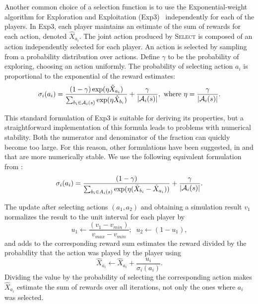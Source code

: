 Another common choice of a selection function is to use the Exponential-weight algorithm for Exploration and Exploitation (Exp3)~\cite{Auer2003Exp3} independently for each of the players.
In Exp3, each player maintains an estimate of the sum of rewards for each action, denoted $\hat{X}_{a_i}$.
The joint action produced by \textsc{Select} is composed of an action independently selected for each player.
An action is selected by sampling from a probability distribution over actions.
Define $\gamma$ to be the probability of exploring, \ie choosing an action uniformly.
The probability of selecting action $a_i$ is proportional to the exponential of the reward estimates:
\begin{equation}\label{eq:exp3select}
\sigma_i(a_i) = \frac{(1-\gamma) \exp(\eta \hat{X}_{a_i})}{\sum_{b_i \in \mathcal{A}_i(s)} \exp(\eta \hat{X}_{b_i})} + \frac{\gamma}{|\mathcal{A}_i(s)|},
  \mbox{ where } \eta = \frac{\gamma}{|\mathcal{A}_i(s)|}.
\end{equation}

This standard formulation of Exp3 is suitable for deriving its properties, but a straightforward implementation of this formula leads to problems with numerical stability. Both the numerator and denominator of the fraction can quickly become too large. For this reason, other formulations have been suggested, \eg in \cite{Lanctot13Goofspiel} and \cite{Cowling12ISMCTS} that are more numerically stable. We use the following equivalent formulation from \cite{Cowling12ISMCTS}:
\begin{equation} \label{eq:exp3:stable}
\sigma_i(a_i) = \frac{(1-\gamma)}{\sum_{b_i \in A_i(s)}\exp(\eta(\hat{X}_{b_i}-\hat{X}_{a_i}))} + \frac{\gamma}{|\mathcal{A}_i(s)|}.
\end{equation}

The update after selecting actions $(a_1,a_2)$ and obtaining a simulation result $v_1$ normalizes the result to the unit interval for each player by
\begin{equation}
u_1 \leftarrow \frac{(v_1 - v_{min})}{v_{max} - v_{min}};\;\; u_2 \leftarrow (1-u_1),
\end{equation}
and adds to the corresponding reward sum estimates the reward divided by the probability that the action was played by the player using
\begin{equation}
\hat{X}_{a_i} \leftarrow \hat{X}_{a_i} + \frac{u_i}{\sigma_i(a_i)}.
\end{equation}
Dividing the value by the probability of selecting the corresponding action makes $\hat{X}_{a_i}$ estimate the sum of rewards over all
iterations, not only the ones where $a_i$ was selected.

